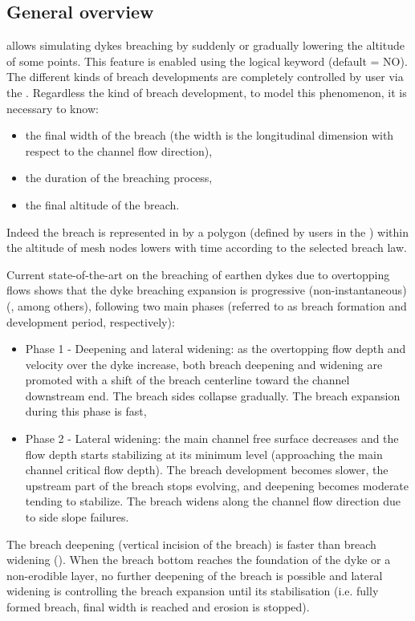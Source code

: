 \subsection{General overview}
 allows simulating dykes breaching by suddenly or gradually
lowering the altitude of some points.
This feature is enabled using the logical keyword  (default = NO).
The different kinds of breach developments are completely controlled by user
via the .
Regardless the kind of breach development, to model this phenomenon,
it is necessary to know:
\begin{itemize}
\item the final width of the breach (the width is the longitudinal dimension
with respect to the channel flow direction),
\item the duration of the breaching process,
\item the final altitude of the breach.
\end{itemize}
Indeed the breach is represented in  by a polygon (defined by users
in the ) within the altitude of mesh nodes lowers
with time according to the selected breach law.

Current state-of-the-art on the breaching of earthen dykes due to overtopping
flows shows that the dyke breaching expansion is progressive (non-instantaneous)
(\cite{Morris2009a,Risher2016,Wu2017,Rifai2017,Rifai2018,Rifai2019}, among
others), following two main phases (referred to as breach formation
and development period, respectively):
\begin{itemize}
\item Phase 1 - Deepening and lateral widening: as the overtopping flow depth and
velocity over the dyke increase, both breach deepening and widening are promoted
with a shift of the breach centerline toward the channel downstream end.
The breach sides collapse gradually. The breach expansion during this phase is
fast,
\item Phase 2 - Lateral widening: the main channel free surface decreases and the
flow depth starts stabilizing at its minimum level (approaching the main channel
critical flow depth). The breach development becomes slower, the upstream part of
the breach stops evolving, and deepening becomes moderate tending to stabilize.
The breach widens along the channel flow direction due to side slope failures.
\end{itemize}
The breach deepening (vertical incision of the breach) is faster than breach
widening (\cite{Morris2009b,Wahl2017,Rifai2017,Rifai2018}). When the breach bottom
reaches the foundation of the dyke or a non-erodible layer, no further deepening
of the breach is possible and lateral widening is controlling the breach
expansion until its stabilisation (i.e. fully formed breach, final width is
reached and erosion is stopped).

